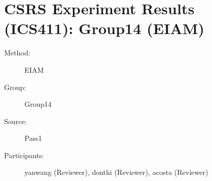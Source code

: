 \chapter {CSRS Experiment Results (ICS411): Group14 (EIAM)}
\small
	  

\begin{description}
\item [Method:] EIAM
\item [Group:] Group14
\item [Source:] Pass1
\item [Participants:] yanwang (Reviewer), donthi (Reviewer), acosta (Reviewer)
\end{description}
